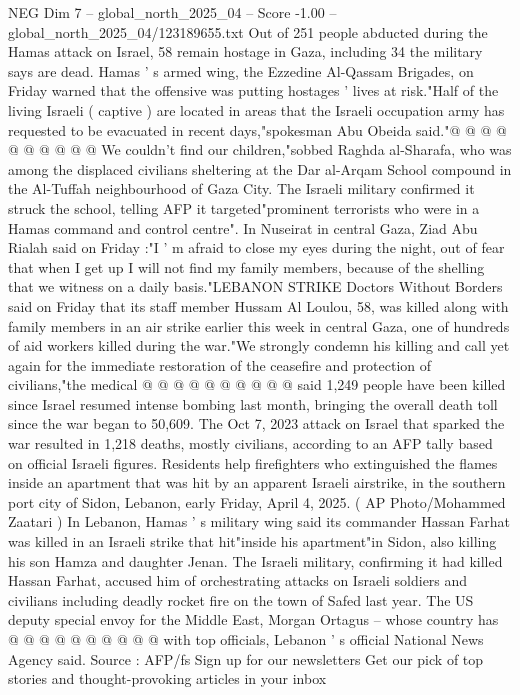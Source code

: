 \begin{textsample}{NEG Dim 7 – global\_north\_2025\_04 – Score -1.00 – global\_north\_2025\_04/123189655.txt}
Out of 251 people abducted during the Hamas attack on Israel, 58 remain hostage in Gaza, including 34 the military says are dead.
Hamas ' s armed wing, the Ezzedine Al-Qassam Brigades, on Friday warned that the offensive was putting hostages ' lives at risk."Half of the living Israeli ( captive ) are located in areas that the Israeli occupation army has requested to be evacuated in recent days,"spokesman Abu Obeida said."@ @ @ @ @ @ @ @ @ @ We couldn't find our children,"sobbed Raghda al-Sharafa, who was among the displaced civilians sheltering at the Dar al-Arqam School compound in the Al-Tuffah neighbourhood of Gaza City.
The Israeli military confirmed it struck the school, telling AFP it targeted"prominent terrorists who were in a Hamas command and control centre".
In Nuseirat in central Gaza, Ziad Abu Rialah said on Friday :"I ' m afraid to close my eyes during the night, out of fear that when I get up I will not find my family members, because of the shelling that we witness on a daily basis."LEBANON STRIKE Doctors Without Borders said on Friday that its staff member Hussam Al Loulou, 58, was killed along with family members in an air strike earlier this week in central Gaza, one of hundreds of aid workers killed during the war."We strongly condemn his killing and call yet again for the immediate restoration of the ceasefire and protection of civilians,"the medical @ @ @ @ @ @ @ @ @ @ said 1,249 people have been killed since Israel resumed intense bombing last month, bringing the overall death toll since the war began to 50,609.
The Oct 7, 2023 attack on Israel that sparked the war resulted in 1,218 deaths, mostly civilians, according to an AFP tally based on official Israeli figures.
Residents help firefighters who extinguished the flames inside an apartment that was hit by an apparent Israeli airstrike, in the southern port city of Sidon, Lebanon, early Friday, April 4, 2025. ( AP Photo/Mohammed Zaatari ) In Lebanon, Hamas ' s military wing said its commander Hassan Farhat was killed in an Israeli strike that hit"inside his apartment"in Sidon, also killing his son Hamza and daughter Jenan.
The Israeli military, confirming it had killed Hassan Farhat, accused him of orchestrating attacks on Israeli soldiers and civilians including deadly rocket fire on the town of Safed last year.
The US deputy special envoy for the Middle East, Morgan Ortagus -- whose country has @ @ @ @ @ @ @ @ @ @ with top officials, Lebanon ' s official National News Agency said.
Source : AFP/fs Sign up for our newsletters Get our pick of top stories and thought-provoking articles in your inbox

\end{textsample}
